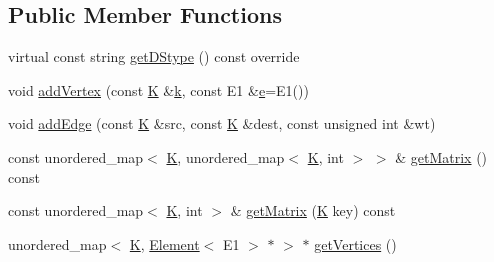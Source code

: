 \subsection*{Public Member Functions}
\begin{DoxyCompactItemize}
\item 
virtual const string \mbox{\hyperlink{classbridges_1_1_graph_adj_matrix_a9b379d65e61755be82bbed01885f1367}{get\+D\+Stype}} () const override
\item 
void \mbox{\hyperlink{classbridges_1_1_graph_adj_matrix_a613fc91a0e056254192e45810405ac6e}{add\+Vertex}} (const \mbox{\hyperlink{namespacebridges_acfb0a4f7877d8f63de3e6862004c50edaa5f3c6a11b03839d46af9fb43c97c188}{K}} \&\mbox{\hyperlink{namespacebridges_acfb0a4f7877d8f63de3e6862004c50eda8ce4b16b22b58894aa86c421e8759df3}{k}}, const E1 \&\mbox{\hyperlink{namespacebridges_acfb0a4f7877d8f63de3e6862004c50edae1671797c52e15f763380b45e841ec32}{e}}=E1())
\item 
void \mbox{\hyperlink{classbridges_1_1_graph_adj_matrix_a785f15a8ca7857a72c34e51ae0c24834}{add\+Edge}} (const \mbox{\hyperlink{namespacebridges_acfb0a4f7877d8f63de3e6862004c50edaa5f3c6a11b03839d46af9fb43c97c188}{K}} \&src, const \mbox{\hyperlink{namespacebridges_acfb0a4f7877d8f63de3e6862004c50edaa5f3c6a11b03839d46af9fb43c97c188}{K}} \&dest, const unsigned int \&wt)
\item 
const unordered\+\_\+map$<$ \mbox{\hyperlink{namespacebridges_acfb0a4f7877d8f63de3e6862004c50edaa5f3c6a11b03839d46af9fb43c97c188}{K}}, unordered\+\_\+map$<$ \mbox{\hyperlink{namespacebridges_acfb0a4f7877d8f63de3e6862004c50edaa5f3c6a11b03839d46af9fb43c97c188}{K}}, int $>$ $>$ \& \mbox{\hyperlink{classbridges_1_1_graph_adj_matrix_aef5c14842d7b8b83037dc63bfd447259}{get\+Matrix}} () const
\item 
const unordered\+\_\+map$<$ \mbox{\hyperlink{namespacebridges_acfb0a4f7877d8f63de3e6862004c50edaa5f3c6a11b03839d46af9fb43c97c188}{K}}, int $>$ \& \mbox{\hyperlink{classbridges_1_1_graph_adj_matrix_a46658c5299cfa6b764fafec321ed2fb3}{get\+Matrix}} (\mbox{\hyperlink{namespacebridges_acfb0a4f7877d8f63de3e6862004c50edaa5f3c6a11b03839d46af9fb43c97c188}{K}} key) const
\item 
unordered\+\_\+map$<$ \mbox{\hyperlink{namespacebridges_acfb0a4f7877d8f63de3e6862004c50edaa5f3c6a11b03839d46af9fb43c97c188}{K}}, \mbox{\hyperlink{classbridges_1_1_element}{Element}}$<$ E1 $>$ $\ast$ $>$ $\ast$ \mbox{\hyperlink{classbridges_1_1_graph_adj_matrix_a83f79301ef6807c2a40f288c808f758b}{get\+Vertices}} ()
\item 

\end{DoxyCompactItemize}
